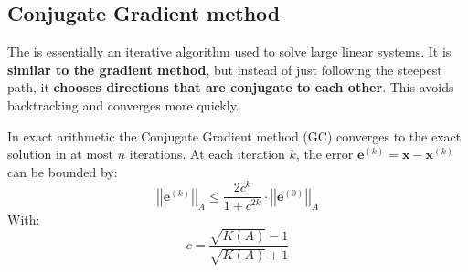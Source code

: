 \subsection{Conjugate Gradient method}\label{subsection: Conjugate Gradient method}

The  is essentially an iterative algorithm used to solve large linear systems. It is \textbf{similar to the gradient method}, but instead of just following the steepest path, it \textbf{chooses directions that are conjugate to each other}. This avoids backtracking and converges more quickly.

\highspace
\begin{theorem}
    In exact arithmetic the Conjugate Gradient method (GC) converges to the exact solution in at most $n$ iterations. At each iteration $k$, the error $\mathbf{e}^{\left(k\right)} = \mathbf{x} - \mathbf{x}^{\left(k\right)}$ can be bounded by:
    \begin{equation}\label{eq: bound error conjugate gradient}
        {\left|\left|\mathbf{e}^{\left(k\right)}\right|\right|}_{A} \le \dfrac{
            2c^{k}
        }{
            1+c^{2k}
        }
        \cdot
        {\left|\left|\mathbf{e}^{\left(0\right)}\right|\right|}_{A}
    \end{equation}
    With:
    \begin{equation}\label{eq: bound c conjugate gradient}
        c = \dfrac{
            \sqrt{K\left(A\right)} - 1
        }{
            \sqrt{K\left(A\right)} + 1
        }
    \end{equation}
\end{theorem}

